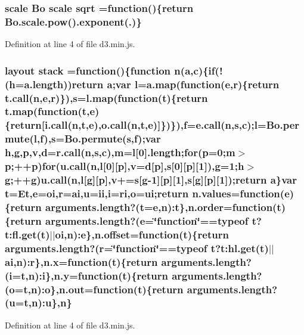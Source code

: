 \subsubsection[{sqrt}]{ {\bf scale} {\bf Bo} {\bf scale} sqrt =function()\{{\bf return} {\bf Bo.\+scale.\+pow}().exponent(.)\}}\label{d3_8min_8js_a62c98d28b5711b44e1271eee2f02f157}


Definition at line 4 of file d3.\+min.\+js.

\subsubsection[{stack}]{ {\bf layout} stack =function()\{function {\bf n}({\bf a},{\bf c})\{{\bf if}(!(h=a.\+length)){\bf return} {\bf a};var l={\bf a.\+map}(function({\bf e},{\bf r})\{{\bf return} {\bf t.\+call}({\bf n},{\bf e},{\bf r})\}),s={\bf l.\+map}(function(t)\{{\bf return} {\bf t.\+map}(function(t,{\bf e})\{{\bf return}[{\bf i.\+call}({\bf n},t,{\bf e}),{\bf o.\+call}({\bf n},t,{\bf e})]\})\}),{\bf f}={\bf e.\+call}({\bf n},s,{\bf c});l={\bf Bo.\+permute}(l,{\bf f}),s={\bf Bo.\+permute}(s,{\bf f});var h,g,p,v,{\bf d}={\bf r.\+call}({\bf n},s,{\bf c}),m=l[0].length;{\bf for}(p=0;m$>$p;++p){\bf for}({\bf u.\+call}({\bf n},l[0][p],v={\bf d}[p],s[0][p][1]),g=1;h$>$g;++g){\bf u.\+call}({\bf n},l[g][p],v+=s[g-\/1][p][1],s[g][p][1]);{\bf return} {\bf a}\}var t=Et,{\bf e}={\bf oi},{\bf r}={\bf ai},u={\bf ii},{\bf i}={\bf ri},{\bf o}={\bf ui};{\bf return} {\bf n.\+values}=function({\bf e})\{{\bf return} arguments.\+length?(t={\bf e},{\bf n})\+:t\},{\bf n.\+order}=function(t)\{{\bf return} arguments.\+length?({\bf e}=\char`\"{}function\char`\"{}==typeof t?t\+:fl.\+get(t)$\vert$$\vert${\bf oi},{\bf n})\+:{\bf e}\},n.\+offset=function(t)\{{\bf return} arguments.\+length?({\bf r}=\char`\"{}function\char`\"{}==typeof t?t\+:hl.\+get(t)$\vert$$\vert${\bf ai},{\bf n})\+:{\bf r}\},{\bf n.\+x}=function(t)\{{\bf return} arguments.\+length?({\bf i}=t,{\bf n})\+:{\bf i}\},n.\+y=function(t)\{{\bf return} arguments.\+length?({\bf o}=t,{\bf n})\+:{\bf o}\},n.\+out=function(t)\{{\bf return} arguments.\+length?(u=t,{\bf n})\+:u\},{\bf n}\}}\label{d3_8min_8js_ab649300f51fc74a4c7cc84c79716030b}


Definition at line 4 of file d3.\+min.\+js.


